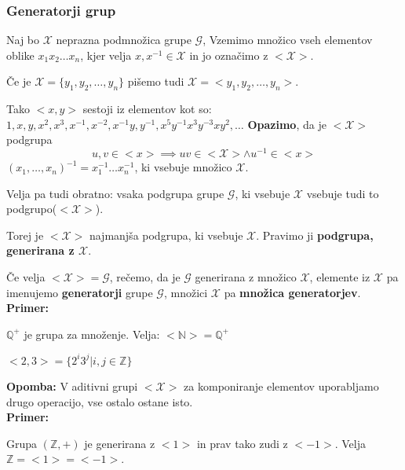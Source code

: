 \documentclass[a4paper]{article}
\newcounter{environment:definition_counter}
\newcounter{environment:theorem_counter}
\newcounter{environment:statement_counter}
\newcounter{example:example_counter}
\newenvironment{example}
{\textbf{Primer:}\\}
{\setcounter{example:example_counter}{0}}
\newenvironment{example_case}
{\refstepcounter{example:example_counter} \arabic{example:example_counter}.}
{\\}
\newenvironment{remark}
{\textbf{Opomba:}}
{}
\begin{document}
\subsubsection{Generatorji grup}
Naj bo $\mathcal{X}$ neprazna podmnožica grupe $\mathcal{G}$, Vzemimo množico vseh elementov oblike $x_1 x_2 \dots x_n$, kjer velja $x, x^{-1} \in \mathcal{X}$ in jo označimo z $<\mathcal{X}>$.
 
Če je $\mathcal{X} = \{y_1, y_2, \dots , y_n\}$ pišemo tudi $\mathcal{X} = <y_1, y_2, \dots , y_n>$. 

Tako $<x,y>$ sestoji iz elementov kot so: $1, x, y, x^2, x^3, x^{-1}, x^{-2}, x^{-1}y, y^{-1}, x^5y^{-1}x^3y^{-3}xy^2, \dots$
\textbf{Opazimo}, da je $<\mathcal{X}>$ podgrupa
$$u,v \in <x> \implies uv \in <\mathcal{X}> \land u^{-1} \in <x>$$
$(x_1,\dots, x_n)^{-1} = x_{1}^{-1} \dots x_n^{-1}$, ki vsebuje množico $\mathcal{X}$.

Velja pa tudi obratno: vsaka podgrupa grupe $\mathcal{G}$, ki vsebuje $\mathcal{X}$ vsebuje tudi to podgrupo($<\mathcal{X}>$).

Torej je $<\mathcal{X}>$ najmanjša podgrupa, ki vsebuje $\mathcal{X}$. Pravimo ji \textbf{podgrupa, generirana z $\mathcal{X}$}.

Če velja $<\mathcal{X}> = \mathcal{G}$, rečemo, da je $\mathcal{G}$ generirana z množico $\mathcal{X}$, elemente iz $\mathcal{X}$ pa imenujemo \textbf{generatorji} grupe $\mathcal{G}$, množici $\mathcal{X}$ pa \textbf{množica generatorjev}.\\

\begin{example}
\begin{example_case}
$\mathbb{Q}^+$ je grupa za množenje. Velja: $<\mathbb{N}> = \mathbb{Q}^+$
\end{example_case}
\begin{example_case}
$<2,3> = \{2^i 3^j | i,j \in \mathbb{Z}\}$
\end{example_case}
\end{example}

\begin{remark}
V aditivni grupi $<\mathcal{X}>$ za komponiranje elementov uporabljamo drugo operacijo, vse ostalo ostane isto.
\end{remark}\\

\begin{example}
\begin{example_case}
Grupa $(\mathbb{Z}, +)$ je generirana z $<1>$ in prav tako zudi z $<-1>$. Velja $\mathbb{Z} = <1> = <-1>$.
\end{example_case}
\end{example}
\end{document}
